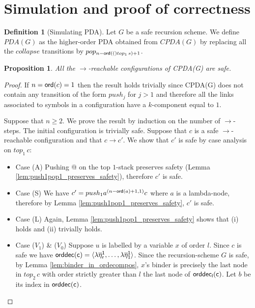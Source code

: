 \documentclass[a4paper]{article}
\newtheorem{proposition}{Proposition}[section]
\theoremstyle{remark}
\theoremstyle{definition}
\newtheorem{definition}{Definition}[section]
\newcommand\orddec{\sf orddec}
\begin{document}
\section{Simulation and proof of correctness}
\begin{definition}[Simulating PDA]
Let $G$ be a safe recursion scheme.
We define $PDA(G)$ as the higher-order PDA obtained from
$CPDA(G)$ by replacing all the $collapse$ transitions by $pop_{n-{\sf ord}(()top_1\,s)+1}$.
\end{definition}

\begin{proposition}
All the $\rightarrow$-reachable configurations of CPDA(G) are safe.
\end{proposition}
\begin{proof}
If $n ={\sf ord}(c) =1$ then the result holds trivially since CPDA(G) does not contain
any transition of the form $push_j$ for $j>1$ and therefore all the links associated to symbols in a configuration have a $k$-component equal to $1$.

Suppose that $n\geq 2$. We prove the result by induction on the number of
$\rightarrow$-steps. The initial configuration is trivially safe.
Suppose that $c$ is a safe $\rightarrow$-reachable configuration and that
$c \rightarrow c'$.
We show that $c'$ is safe by case analysis on $top_1\,c$:
\begin{itemize}
\item Case (A) Pushing @ on the top $1$-stack preserves safety (Lemma
\ref{lem:push1pop1_preserves_safety}), therefore $c'$ is safe.

\item Case (S)
We have $c' = push_1 a^{(n-{\sf ord}(a)+1,1)} c$ where $a$ is a
lambda-node, therefore by Lemma \ref{lem:push1pop1_preserves_safety},
$c'$ is safe.

\item Case (L) Again, Lemma \ref{lem:push1pop1_preserves_safety}
shows that (i) holds and (ii) trivially holds.

\item Case ($V_1$) \& ($V_0$) Suppose $u$ is labelled by a variable $x$ of order $l$.
Since $c$ is safe we have $\orddec(c) = \langle \lambda
\overline{\eta}_r^1 , \ldots, \lambda \overline{\eta}_1^1
\rangle$. Since the recursion-scheme $G$ is safe, by Lemma \ref{lem:binder_in_ordecompos}, $x$'s binder is precisely the
last node in $top_2\, c$ with order strictly greater than $l$ \ie the last node of $\orddec_l(c)$. Let $b$ be its index in $\orddec(c)$.



\end{itemize}
\end{proof}
\end{document}
